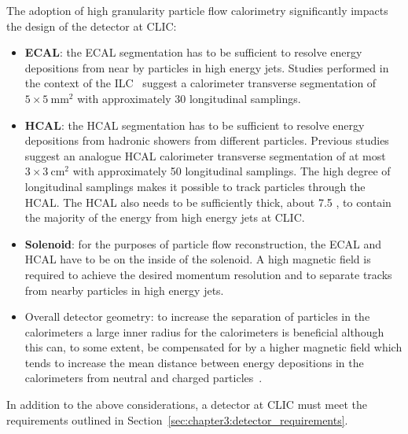 The adoption of high granularity particle flow calorimetry significantly impacts the design of the detector at CLIC:
\begin{itemize}
 \item {\bf ECAL}: the ECAL segmentation has to be sufficient to resolve energy
 depositions from near by particles in high energy jets. Studies performed in
 the context of the \acs{ILC}~\cite{thomson:pandora,ildloi:2009} suggest a calorimeter
 transverse segmentation of $5\times5~\mathrm{mm}^2$ with approximately 30 longitudinal samplings.
 \item {\bf HCAL}: the HCAL segmentation has to be sufficient to resolve energy
 depositions from hadronic showers from different particles. Previous
 studies~\cite{thomson:pandora,ildloi:2009} suggest an analogue HCAL calorimeter
 transverse segmentation of at most $3\times3~\mathrm{cm}^2$ with approximately 50
 longitudinal samplings. The high degree of longitudinal samplings makes it
 possible to track particles through the HCAL\@. The HCAL also needs to be
 sufficiently thick, about 7.5 \lambdaint, to contain the majority of the energy 
 from high energy jets at CLIC.
 \item {\bf Solenoid}: for the purposes of particle flow reconstruction, the
ECAL and HCAL have to be on the inside of the solenoid. A high magnetic
field 
is required to achieve the desired momentum resolution
and to separate tracks from nearby particles in high energy jets.
\item Overall detector geometry: to increase the separation of particles in the
calorimeters a large inner radius for the calorimeters is beneficial although
this can, to some extent, be compensated for by a higher magnetic field which
tends to increase the mean distance between energy depositions in the
calorimeters from neutral and charged particles~\cite{thomson:pandora}.
\end{itemize}
In addition to the above considerations, a detector at CLIC must meet the requirements outlined in 
Section~\ref{sec:chapter3:detector_requirements}.
 


